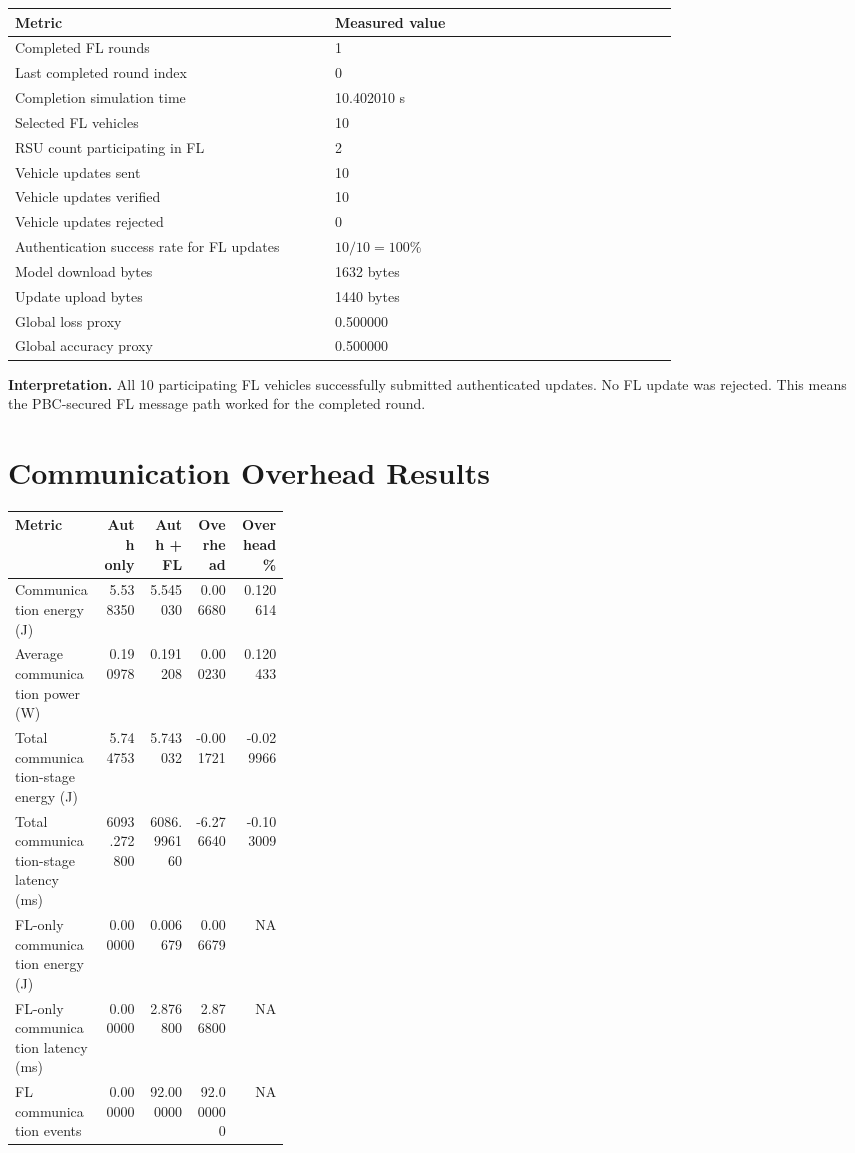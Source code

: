 \documentclass[11pt,a4paper]{article}
\newcommand{\na}{\textsc{NA}}
\begin{document}
\begin{longtable}{p{0.42\linewidth}p{0.45\linewidth}}
\toprule
\textbf{Metric} & \textbf{Measured value} \\
\midrule
Completed FL rounds & 1 \\
Last completed round index & 0 \\
Completion simulation time & 10.402010 s \\
Selected FL vehicles & 10 \\
RSU count participating in FL & 2 \\
Vehicle updates sent & 10 \\
Vehicle updates verified & 10 \\
Vehicle updates rejected & 0 \\
Authentication success rate for FL updates & $10/10=100\%$ \\
Model download bytes & 1632 bytes \\
Update upload bytes & 1440 bytes \\
Global loss proxy & 0.500000 \\
Global accuracy proxy & 0.500000 \\
\bottomrule
\end{longtable}

\textbf{Interpretation.} All 10 participating FL vehicles successfully submitted
authenticated updates. No FL update was rejected. This means the PBC-secured FL
message path worked for the completed round.

\section{Communication Overhead Results}

\begin{longtable}{p{0.32\linewidth}rrrr}
\toprule
\textbf{Metric} & \textbf{Auth only} & \textbf{Auth + FL} & \textbf{Overhead} & \textbf{Overhead \%} \\
\midrule
Communication energy (J) & 5.538350 & 5.545030 & 0.006680 & 0.120614 \\
Average communication power (W) & 0.190978 & 0.191208 & 0.000230 & 0.120433 \\
Total communication-stage energy (J) & 5.744753 & 5.743032 & -0.001721 & -0.029966 \\
Total communication-stage latency (ms) & 6093.272800 & 6086.996160 & -6.276640 & -0.103009 \\
FL-only communication energy (J) & 0.000000 & 0.006679 & 0.006679 & \na \\
FL-only communication latency (ms) & 0.000000 & 2.876800 & 2.876800 & \na \\
FL communication events & 0.000000 & 92.000000 & 92.000000 & \na \\
\bottomrule
\end{longtable}
\end{document}
